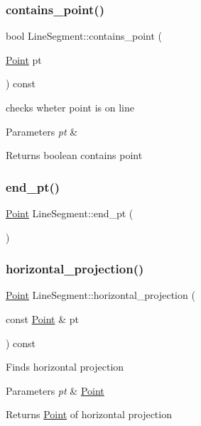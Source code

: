 \subsubsection{\texorpdfstring{contains\_point()}{contains\_point()}}
{\footnotesize\ttfamily bool Line\+Segment\+::contains\+\_\+point (\begin{DoxyParamCaption}\item[{\mbox{\hyperlink{class_point}{Point}}}]{pt }\end{DoxyParamCaption}) const}

checks wheter point is on line 
\begin{DoxyParams}{Parameters}
{\em pt} & \\
\hline
\end{DoxyParams}
\begin{DoxyReturn}{Returns}
boolean contains point 
\end{DoxyReturn}
\mbox{\label{class_line_segment_a7af4d5a73aa4f89275cda6ea2b5cfbb2}} 
\subsubsection{\texorpdfstring{end\_pt()}{end\_pt()}}
{\footnotesize\ttfamily \mbox{\hyperlink{class_point}{Point}} Line\+Segment\+::end\+\_\+pt (\begin{DoxyParamCaption}{ }\end{DoxyParamCaption})}

\mbox{\label{class_line_segment_a25c84a7d07cfd4b594a0fd7b2b37dd18}} 
\subsubsection{\texorpdfstring{horizontal\_projection()}{horizontal\_projection()}}
{\footnotesize\ttfamily \mbox{\hyperlink{class_point}{Point}} Line\+Segment\+::horizontal\+\_\+projection (\begin{DoxyParamCaption}\item[{const \mbox{\hyperlink{class_point}{Point}} \&}]{pt }\end{DoxyParamCaption}) const}

Finds horizontal projection 
\begin{DoxyParams}{Parameters}
{\em pt} & \mbox{\hyperlink{class_point}{Point}} \\
\hline
\end{DoxyParams}
\begin{DoxyReturn}{Returns}
\mbox{\hyperlink{class_point}{Point}} of horizontal projection 
\end{DoxyReturn}
\mbox{\label{class_line_segment_a3bdc73ce4696a76b7c7dd143556c95b6}} 
